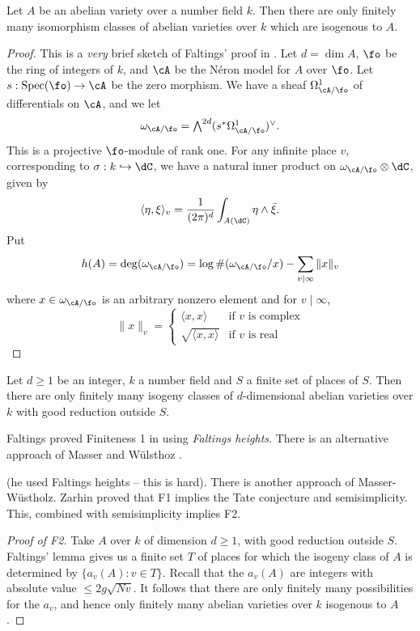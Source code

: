 \begin{conjecture}[Finiteness I]
Let $A$ be an abelian variety over a number field $k$. Then there are only 
finitely many isomorphism classes of abelian varieties over $k$ which are 
isogenous to $A$. 
\end{conjecture}
\begin{proof}
This is a \emph{very} brief sketch of Faltings' proof in \cite{fa86}. Let 
$d=\dim A$, $\fo$ be the ring of integers of $k$, and $\cA$ be the N\'eron 
model for $A$ over $\fo$. Let $s:\spec(\fo)\to\cA$ be the zero morphism. We 
have a sheaf $\Omega^1_{\cA/\fo}$ of differentials on $\cA$, and we let 
\[
  \omega_{\cA/\fo} = \textstyle\bigwedge^{2 d} (s^\ast \Omega_{\cA/\fo}^1)^\vee \text{.}
\]
This is a projective $\fo$-module of rank one. For any infinite place $v$, 
corresponding to $\sigma:k\hookrightarrow \dC$, we have a natural inner product 
on $\omega_{\cA/\fo}\otimes\dC$, given by 
\[
  \langle \eta,\xi\rangle_v = \frac{1}{(2\pi)^d} \int_{A(\dC)} \eta \wedge \bar\xi \text{.}
\]
Put 
\[
  h(A) = \deg(\omega_{\cA/\fo}) = \log \# (\omega_{\cA/\fo} / x) - \sum_{v\mid \infty} \| x\|_v
\]
where $x\in \omega_{\cA/\fo}$ is an arbitrary nonzero element and for 
$v\mid\infty$, 
\[
  \|x\|_v = \begin{cases} \langle x,x\rangle & \text{if $v$ is complex} \\ \sqrt{\langle x,x\rangle} & \text{if $v$ is real}\end{cases} 
\]
\end{proof}

\begin{conjecture}[Finiteness II]
Let $d\geqslant 1$ be an integer, $k$ a number field and $S$ a finite set of 
places of $S$. Then there are only finitely many isogeny classes of 
$d$-dimensional abelian varieties over $k$ with good reduction outside $S$. 
\end{conjecture}

Faltings proved Finiteness 1 in \cite{fa86} using \emph{Faltings heights}. 
There is an alternative approach of Masser and W\"ulsthoz \cite{mw93}. 

(he used Faltings heights -- this is hard). There is 
another approach of Masser-W\"ustholz. Zarhin proved that F1 implies the 
Tate conjecture and semisimplicity. This, combined with semisimplicity 
implies F2. 

\begin{proof}[Proof of F2]
Take $A$ over $k$ of dimension $d\geqslant 1$, with good reduction outside $S$. 
Faltings' lemma gives us a finite set $T$ of places for which the isogeny class 
of $A$ is determined by $\{a_v(A):v\in T\}$. Recall that the $a_v(A)$ are 
integers with absolute value $\leqslant 2 g\sqrt{N v}$. It follows that there 
are only finitely many possibilities for the $a_v$, and hence only finitely 
many abelian varieties over $k$ isogenous to $A$. 
\end{proof}

